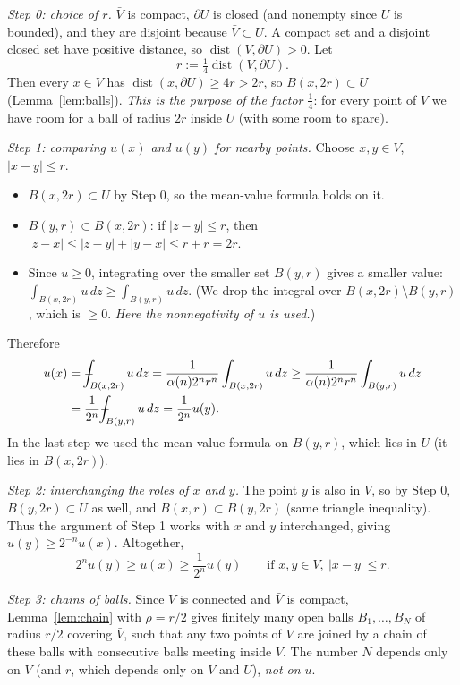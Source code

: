 \documentclass[11pt]{article}
\def\Xint#1{\mathchoice
  {\XXint\displaystyle\textstyle{#1}}%
  {\XXint\textstyle\scriptstyle{#1}}%
  {\XXint\scriptstyle\scriptscriptstyle{#1}}%
  {\XXint\scriptscriptstyle\scriptscriptstyle{#1}}%
  \!\int}
\def\XXint#1#2#3{{\setbox0=\hbox{$#1{#2#3}{\int}$}
  \vcenter{\hbox{$#2#3$}}\kern-.5\wd0}}
\def\fint{\Xint-}
\theoremstyle{plain}
\theoremstyle{definition}
\theoremstyle{remark}
\begin{document}
\emph{Step 0: choice of $r$.} $\bar V$ is compact, $\partial U$ is closed (and nonempty since $U$ is bounded), and they are disjoint because $\bar V \subset U$. A compact set and a disjoint closed set have positive distance, so $\operatorname{dist}(V,\partial U) > 0$. Let
$$ r := \tfrac14\operatorname{dist}(V,\partial U). $$
Then every $x \in V$ has $\operatorname{dist}(x,\partial U) \geq 4r > 2r$, so $B(x,2r) \subset U$ (Lemma~\ref{lem:balls}). \emph{This is the purpose of the factor $\frac14$}: for every point of $V$ we have room for a ball of radius $2r$ inside $U$ (with some room to spare).

\emph{Step 1: comparing $u(x)$ and $u(y)$ for nearby points.} Choose $x, y \in V$, $|x - y| \leq r$.
\begin{itemize}
    \item $B(x,2r) \subset U$ by Step 0, so the mean-value formula holds on it.
    \item $B(y,r) \subset B(x,2r)$: if $|z - y| \leq r$, then $|z - x| \leq |z - y| + |y - x| \leq r + r = 2r$.
    \item Since $u \geq 0$, integrating over the smaller set $B(y,r)$ gives a smaller value: $\int_{B(x,2r)} u\, dz \geq \int_{B(y,r)} u\, dz$. (We drop the integral over $B(x,2r)\setminus B(y,r)$, which is $\geq 0$. \emph{Here the nonnegativity of $u$ is used.})
\end{itemize}
Therefore
\begin{align*}
u(x) &= \fint_{B(x,2r)} u\, dz = \frac{1}{\alpha(n)2^nr^n}\int_{B(x,2r)} u\, dz \geq \frac{1}{\alpha(n)2^nr^n}\int_{B(y,r)} u\, dz \\
&= \frac{1}{2^n}\fint_{B(y,r)} u\, dz = \frac{1}{2^n}u(y).
\end{align*}
In the last step we used the mean-value formula on $B(y,r)$, which lies in $U$ (it lies in $B(x,2r)$).

\emph{Step 2: interchanging the roles of $x$ and $y$.} The point $y$ is also in $V$, so by Step 0, $B(y,2r) \subset U$ as well, and $B(x,r) \subset B(y,2r)$ (same triangle inequality). Thus the argument of Step 1 works with $x$ and $y$ interchanged, giving $u(y) \geq 2^{-n}u(x)$. Altogether,
$$ 2^n u(y) \geq u(x) \geq \frac{1}{2^n}u(y) \qquad \text{if } x, y \in V,\ |x - y| \leq r. $$

\emph{Step 3: chains of balls.} Since $V$ is connected and $\bar V$ is compact, Lemma~\ref{lem:chain} with $\rho = r/2$ gives finitely many open balls $B_1, \dots, B_N$ of radius $r/2$ covering $\bar V$, such that any two points of $V$ are joined by a chain of these balls with consecutive balls meeting inside $V$. The number $N$ depends only on $V$ (and $r$, which depends only on $V$ and $U$), \emph{not on $u$}.
\end{document}
